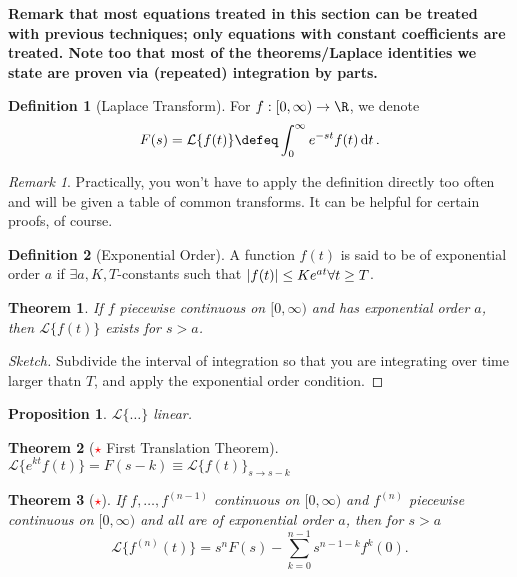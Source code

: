 \documentclass[12pt, oneside]{article}
\newcommand{\laplace}[1]{\mathcal{L}\{#1\}}
\theoremstyle{definition}
\newtheorem{defn}{Definition}
\theoremstyle{plain}
\newtheorem{thm}{Theorem}
\newtheorem{prop}{Proposition}
\theoremstyle{remark}
\newtheorem{remark}{Remark}
\begin{document}
\textbf{Remark that most equations treated in this section can be treated with previous techniques; only equations with constant coefficients are treated.
Note too that most of the theorems/Laplace identities we state are proven via (repeated) integration by parts.
}

\begin{defn}[Laplace Transform]
  For $f : [0, \infty) \to \R$, we denote \[
  F(s) = \laplace{f(t)}   \defeq \int_{0}^\infty e^{-st} f(t) \dd{t}.
  \]
\end{defn}
\begin{remark}
  Practically, you won't have to apply the definition directly too often and will be given a table of common transforms. It can be helpful for certain proofs, of course.
\end{remark}
\begin{defn}[Exponential Order]
  A function $f(t)$ is said to be of exponential order $a$ if $\exists a, K, T$-constants such that $\abs{f(t)} \leq Ke^{at} \forall t \geq T$.
\end{defn}

\begin{thm}
If $f$ piecewise continuous on $[0, \infty)$ and has exponential order $a$, then $\laplace{f(t)}$ exists for $s > a$.
\end{thm}
\begin{proof}[Sketch]
Subdivide the interval of integration so that you are integrating over time larger thatn $T$, and apply the exponential order condition. 
\end{proof}

\begin{prop}
  $\laplace{\dots}$ linear.
\end{prop}

\begin{thm}[\textcolor{red}{$\star$} First Translation Theorem]
  $\laplace{e^{kt} f(t)} = F(s - k) \equiv \laplace{f(t)}_{s \to s- k}$
\end{thm}

\begin{thm}[\textcolor{red}{$\star$}]
  If $f, \dots, f^{(n-1)}$ continuous on $[0, \infty)$ and $f^{(n)}$ piecewise continuous on $[0, \infty)$ and all are of exponential order $a$, then for $s > a$ \[
  \laplace{f^{(n)}(t)} = s^{n} F(s) - \sum_{k=0}^{n-1} s^{n-1-k}f^{k}(0).
  \]
\end{thm}
\end{document}
